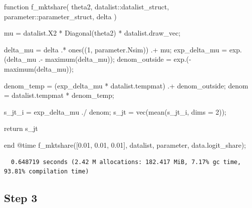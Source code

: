 \documentclass[
  letterpaper,
  DIV=11,
  numbers=noendperiod]{scrreprt}
\newenvironment{Shaded}{\begin{snugshade}}{\end{snugshade}}
\newcommand{\CharTok}[1]{\textcolor[rgb]{0.13,0.47,0.30}{#1}}
\newcommand{\ControlFlowTok}[1]{\textcolor[rgb]{0.00,0.23,0.31}{#1}}
\newcommand{\DataTypeTok}[1]{\textcolor[rgb]{0.68,0.00,0.00}{#1}}
\newcommand{\FloatTok}[1]{\textcolor[rgb]{0.68,0.00,0.00}{#1}}
\newcommand{\FunctionTok}[1]{\textcolor[rgb]{0.28,0.35,0.67}{#1}}
\newcommand{\KeywordTok}[1]{\textcolor[rgb]{0.00,0.23,0.31}{#1}}
\newcommand{\NormalTok}[1]{\textcolor[rgb]{0.00,0.23,0.31}{#1}}
\newcommand{\OperatorTok}[1]{\textcolor[rgb]{0.37,0.37,0.37}{#1}}
\newcommand{\PreprocessorTok}[1]{\textcolor[rgb]{0.68,0.00,0.00}{#1}}
\begin{document}
\begin{Shaded}
\begin{Highlighting}[]
\KeywordTok{function} \FunctionTok{f\_mktshare}\NormalTok{(}
\NormalTok{        theta2,}
\NormalTok{        datalist}\OperatorTok{::}\DataTypeTok{datalist\_struct}\NormalTok{,}
\NormalTok{        parameter}\OperatorTok{::}\DataTypeTok{parameter\_struct}\NormalTok{,}
\NormalTok{        delta}
\NormalTok{    )}
        
\NormalTok{    mu }\OperatorTok{=}\NormalTok{ datalist.X2 }\OperatorTok{*} \FunctionTok{Diagonal}\NormalTok{(theta2) }\OperatorTok{*}\NormalTok{ datalist.draw\_vec;}
    
\NormalTok{    delta\_mu }\OperatorTok{=}\NormalTok{ delta }\OperatorTok{.*} \FunctionTok{ones}\NormalTok{((}\FloatTok{1}\NormalTok{, parameter.Nsim)) }\OperatorTok{.+}\NormalTok{ mu;}
\NormalTok{    exp\_delta\_mu }\OperatorTok{=} \FunctionTok{exp}\NormalTok{.(delta\_mu }\OperatorTok{.{-}} \FunctionTok{maximum}\NormalTok{(delta\_mu));}
\NormalTok{    denom\_outside }\OperatorTok{=} \FunctionTok{exp}\NormalTok{.(}\FunctionTok{{-}maximum}\NormalTok{(delta\_mu));}
    
\NormalTok{    denom\_temp }\OperatorTok{=}\NormalTok{ (exp\_delta\_mu}\OperatorTok{\textquotesingle{}} \OperatorTok{*}\NormalTok{ datalist.tempmat)}\CharTok{\textquotesingle{} .+ denom\_outside;}
\NormalTok{    denom }\OperatorTok{=}\NormalTok{ datalist.tempmat }\OperatorTok{*}\NormalTok{ denom\_temp;}
    
\NormalTok{    s\_jt\_i }\OperatorTok{=}\NormalTok{ exp\_delta\_mu }\OperatorTok{./}\NormalTok{ denom;}
\NormalTok{    s\_jt }\OperatorTok{=} \FunctionTok{vec}\NormalTok{(}\FunctionTok{mean}\NormalTok{(s\_jt\_i, dims }\OperatorTok{=} \FloatTok{2}\NormalTok{));}
    
    \ControlFlowTok{return}\NormalTok{ s\_jt}
    
\KeywordTok{end}
\PreprocessorTok{@time} \FunctionTok{f\_mktshare}\NormalTok{([}\FloatTok{0.01}\NormalTok{, }\FloatTok{0.01}\NormalTok{, }\FloatTok{0.01}\NormalTok{], datalist, parameter, data.logit\_share);}
\end{Highlighting}
\end{Shaded}

\begin{verbatim}
  0.648719 seconds (2.42 M allocations: 182.417 MiB, 7.17% gc time, 93.81% compilation time)
\end{verbatim}

\hypertarget{step-3}{%
\subsection{Step 3}\label{step-3}}
\end{document}
